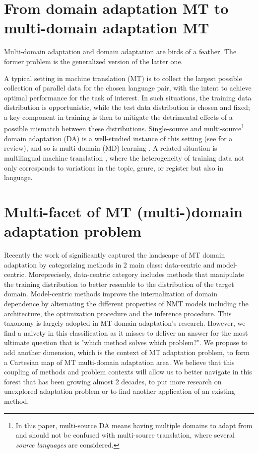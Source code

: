 \section{From domain adaptation MT to multi-domain adaptation MT}
Multi-domain adaptation and domain adaptation are birds of a feather. The former problem is the generalized version of the latter one. 

A typical setting in machine translation (MT) is to collect the largest possible collection of parallel data for the chosen language pair, with the intent to achieve optimal performance for the task of interest. In such situations, the training data distribution is opportunistic, while the test data distribution is chosen and fixed; a key component in training is then to mitigate the detrimental effects of a possible mismatch between these distributions. Single-source and multi-source\footnote{In this paper, multi-source DA means having multiple domains to adapt from and should not be confused with multi-source translation, where several \emph{source languages} are considered.} domain adaptation (DA) is a well-studied instance of this setting (see \citet{Chu17comparison,Saunders21asurvey} for a review), and so is multi-domain (MD) learning \citep{Chu18multilingual,Zeng18multidomain,Jiang19multidomain,Pham21revisiting}. A related situation is multilingual machine translation \citep{Firat16multiway,Ha16towards,Johnson17google,Aharoni19massively},
where the heterogeneity of training data not only corresponds to variations in the topic, genre, or register but also in language.

\section{Multi-facet of MT (multi-)domain adaptation problem}
Recently the work of \citet{Chu18survey} significantly captured the landscape of MT domain adaptation by categorizing methods in 2 main class: data-centric and model-centric. Moreprecisely, data-centric category includes methods that manipulate the training distribution to better resemble to the distribution of the target domain. Model-centric methods improve the internalization of domain dependence by alternating the different properties of NMT models including the architecture, the optimization procedure and the inference procedure. This taxonomy is largely adopted in MT domain adaptation's research. However, we find a naivety in this classification as it misses to deliver an answer for the most ultimate question that is "which method solves which problem?". We propose to add another dimension, which is the context of MT adaptation problem, to form a Cartesian map of MT multi-domain adaptation area. We believe that this coupling of methods and problem contexts will allow us to better navigate in this forest that has been growing almost 2 decades, to put more research on unexplored adaptation problem or to find another application of an existing method.

